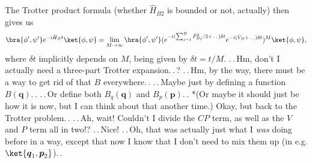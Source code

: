 \documentclass{report}
\begin{document}
The Trotter product formula (whether $\hat H_{B2}$ is bounded or not, actually) then gives us
\begin{align}
\begin{aligned}
	\bra{\phi', \psi'}
		e^{-i \hat H_{B} t}
	\ket{\phi, \psi} =
	\lim_{M \to \infty} 
	\bra{\phi', \psi'}
		(e^{-i (\sum_{j=1}^D \hat P_{B j}^2 / 2 + \,.\,.\,) \delta t} e^{-i (\hat V_{B} + \,.\,.\,) \delta t})^M
	\ket{\phi, \psi},
\end{aligned}
\end{align} 
where $\delta t$ implicitly depends on $M$, being given by $\delta t = t/M$. .\,.\,Hm, don't I actually need a three-part Trotter expansion.\,.\,? .\,.\,Hm, by the way, there must be a way to get rid of that $B$ everywhere.\,. .\,.\,Maybe just by defining a function $B(\boldsymbol{q})$.\,. .\,.\,Or define both $B_q(\boldsymbol{q})$ and $B_p(\boldsymbol{p})$.\,. *(Or maybe it should just be how it is now, but I can think about that another time.) Okay, but back to the Trotter problem.\,. .\,.\,Ah, wait! Couldn't I divide the $CP$ term, as well as the $V$ and $P$ term all in two!? .\,.\,Nice! .\,.\,Oh, that was actually just what I \emph{was} doing before in a way, except that now I know that I don't need to mix them up (in e.g. $\ket{\boldsymbol{q}_1, \boldsymbol{p}_2}$).\,. 
\end{document}
